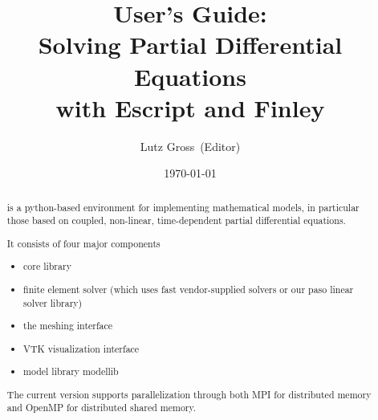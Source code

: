 \documentclass{manual}
\title{\module{esys} User's Guide:\\ Solving Partial Differential Equations\\ with Escript and Finley}
\author{Lutz Gross\etal~(Editor)}
\date{\today}
\begin{document}
\maketitle



\begin{abstract}
\escript is a python-based environment for implementing mathematical models, in particular those based on coupled, non-linear, time-dependent partial differential equations.

It consists of four major components
\begin{itemize}
\item \escript core library
\item finite element solver \finley (which uses fast vendor-supplied solvers or our paso linear solver library)
\item the meshing interface \pycad
\item VTK visualization interface \pyvisi
\item model library modellib
\end{itemize}
The current version supports parallelization through both MPI for distributed memory and OpenMP for distributed shared memory. 
\end{abstract}

\tableofcontents














% 

%



\makemodindex

\printindex
%



\end{document}
